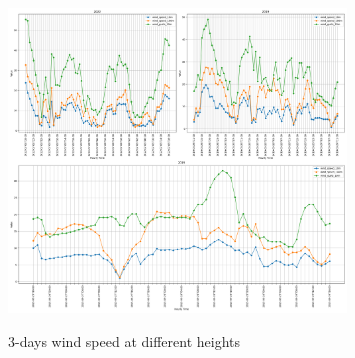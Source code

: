 \begin{figure}[h]
	\centering
	\caption{3-days wind speed at different heights}
	\includegraphics[width=0.8\textwidth]{graphs/weather_variables/3_wind_speed_10m_wind_speed_100m_wind_gusts_10m.png}
	\label{fig:wind_speed}
\end{figure}






